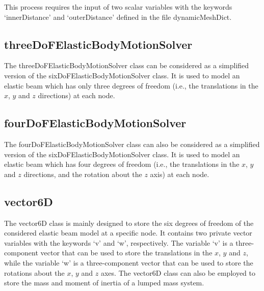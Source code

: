 \noindent This process requires the input of two scalar variables with the keywords `innerDistance' and `outerDistance' defined in the file dynamicMeshDict.

\subsection{threeDoFElasticBodyMotionSolver}

The threeDoFElasticBodyMotionSolver class can be considered as a simplified version of the sixDoFElasticBodyMotionSolver class. It is used to model an elastic beam which has only three degrees of freedom (i.e., the translations in the $x$, $y$ and $z$ directions) at each node.

\subsection{fourDoFElasticBodyMotionSolver}

The fourDoFElasticBodyMotionSolver class can also be considered as a simplified version of the sixDoFElasticBodyMotionSolver class. It is used to model an elastic beam which has four degrees of freedom (i.e., the translations in the $x$, $y$ and $z$ directions, and the rotation about the $z$ axis) at each node.
     
\subsection{vector6D}

The vector6D class is mainly designed to store the six degrees of freedom of the considered elastic beam model at a specific node. It contains two private vector variables with the keywords `v' and `w', respectively. The variable `v' is a three-component vector that can be used to store the translations in the $x$, $y$ and $z$, while the variable `w' is a three-component vector that can be used to store the rotations about the $x$, $y$ and $z$ axes. The vector6D class can also be employed to store the mass and moment of inertia of a lumped mass system.

